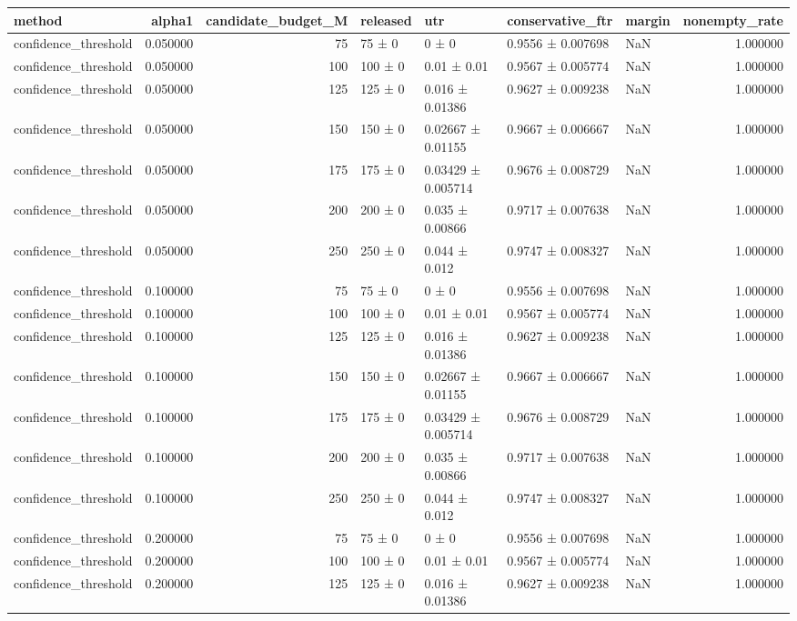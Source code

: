 \begin{tabular}{lrrllllr}
\toprule
method & alpha1 & candidate_budget_M & released & utr & conservative_ftr & margin & nonempty_rate \\
\midrule
confidence_threshold & 0.050000 & 75 & 75 ± 0 & 0 ± 0 & 0.9556 ± 0.007698 & NaN & 1.000000 \\
confidence_threshold & 0.050000 & 100 & 100 ± 0 & 0.01 ± 0.01 & 0.9567 ± 0.005774 & NaN & 1.000000 \\
confidence_threshold & 0.050000 & 125 & 125 ± 0 & 0.016 ± 0.01386 & 0.9627 ± 0.009238 & NaN & 1.000000 \\
confidence_threshold & 0.050000 & 150 & 150 ± 0 & 0.02667 ± 0.01155 & 0.9667 ± 0.006667 & NaN & 1.000000 \\
confidence_threshold & 0.050000 & 175 & 175 ± 0 & 0.03429 ± 0.005714 & 0.9676 ± 0.008729 & NaN & 1.000000 \\
confidence_threshold & 0.050000 & 200 & 200 ± 0 & 0.035 ± 0.00866 & 0.9717 ± 0.007638 & NaN & 1.000000 \\
confidence_threshold & 0.050000 & 250 & 250 ± 0 & 0.044 ± 0.012 & 0.9747 ± 0.008327 & NaN & 1.000000 \\
confidence_threshold & 0.100000 & 75 & 75 ± 0 & 0 ± 0 & 0.9556 ± 0.007698 & NaN & 1.000000 \\
confidence_threshold & 0.100000 & 100 & 100 ± 0 & 0.01 ± 0.01 & 0.9567 ± 0.005774 & NaN & 1.000000 \\
confidence_threshold & 0.100000 & 125 & 125 ± 0 & 0.016 ± 0.01386 & 0.9627 ± 0.009238 & NaN & 1.000000 \\
confidence_threshold & 0.100000 & 150 & 150 ± 0 & 0.02667 ± 0.01155 & 0.9667 ± 0.006667 & NaN & 1.000000 \\
confidence_threshold & 0.100000 & 175 & 175 ± 0 & 0.03429 ± 0.005714 & 0.9676 ± 0.008729 & NaN & 1.000000 \\
confidence_threshold & 0.100000 & 200 & 200 ± 0 & 0.035 ± 0.00866 & 0.9717 ± 0.007638 & NaN & 1.000000 \\
confidence_threshold & 0.100000 & 250 & 250 ± 0 & 0.044 ± 0.012 & 0.9747 ± 0.008327 & NaN & 1.000000 \\
confidence_threshold & 0.200000 & 75 & 75 ± 0 & 0 ± 0 & 0.9556 ± 0.007698 & NaN & 1.000000 \\
confidence_threshold & 0.200000 & 100 & 100 ± 0 & 0.01 ± 0.01 & 0.9567 ± 0.005774 & NaN & 1.000000 \\
confidence_threshold & 0.200000 & 125 & 125 ± 0 & 0.016 ± 0.01386 & 0.9627 ± 0.009238 & NaN & 1.000000 \\

\end{tabular}
